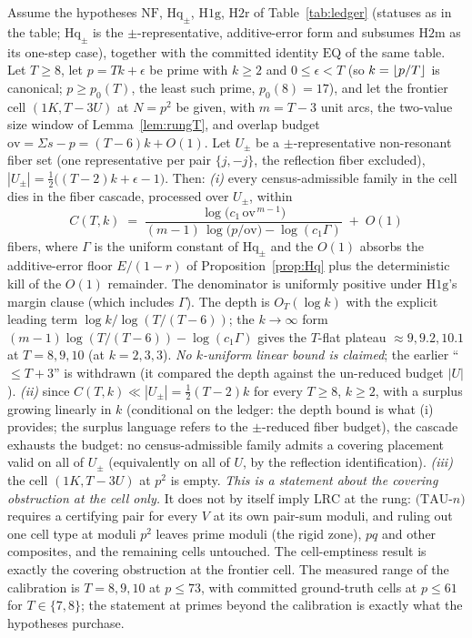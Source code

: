 \begin{theorem}\label{thm:SC}
Assume the hypotheses $\mathrm{NF}$, $\mathrm{Hq}_\pm$, $\mathrm{H1g}$,
$\mathrm{H2r}$ of Table~\ref{tab:ledger} (statuses as in the table;
$\mathrm{Hq}_\pm$ is the $\pm$-representative, additive-error form and
subsumes $\mathrm{H2m}$ as its one-step case), together with the
committed identity $\mathrm{EQ}$ of the same table. Let $T\ge 8$, let
$p=Tk+\epsilon$ be prime with $k\ge 2$ and $0\le\epsilon<T$ (so $k=\left\lfloor p/T \right\rfloor$
is canonical; $p\ge p_0(T)$, the least such prime, $p_0(8)=17$), and let the
frontier cell $(1K,T{-}3U)$ at $N=p^2$ be given, with $m=T-3$ unit arcs, the
two-value size window of Lemma~\ref{lem:rungT}, and overlap budget
$\mathrm{ov}=\Sigma s-p=(T-6)k+O(1)$. Let $U_\pm$ be a $\pm$-representative
non-resonant fiber set (one representative per pair $\{j,-j\}$, the
reflection fiber excluded), $|U_\pm|=\tfrac12\bigl((T-2)k+\epsilon-1\bigr)$.
Then:
\smallskip
\emph{(i)} every census-admissible family in the cell dies in the fiber
cascade, processed over $U_\pm$, within
\[
C(T,k)\;=\;
\frac{\log\!\bigl(c_1\,\mathrm{ov}^{\,m-1}\bigr)}
     {(m-1)\,\log\!\bigl(p/\mathrm{ov}\bigr)-\log(c_1\Gamma)}
\;+\;O(1)
\]
fibers, where $\Gamma$ is the uniform constant of $\mathrm{Hq}_\pm$ and the
$O(1)$ absorbs the additive-error floor $E/(1-r)$ of
Proposition~\ref{prop:Hq} plus the deterministic kill of the $O(1)$
remainder. The denominator is uniformly positive under $\mathrm{H1g}$'s
margin clause (which includes $\Gamma$). The depth is $O_T(\log k)$ with the
explicit leading term $\log k/\log(T/(T-6))$; the $k\to\infty$ form
$(m-1)\log(T/(T-6))-\log(c_1\Gamma)$ gives the $T$-flat plateau
$\approx 9,9.2,10.1$ at $T=8,9,10$ (at $k=2,3,3$). \emph{No $k$-uniform
linear bound is claimed}; the earlier ``$\le T+3$'' is withdrawn (it compared
the depth against the un-reduced budget $|U|$).
\smallskip
\emph{(ii)} since $C(T,k)\ll|U_\pm|=\tfrac12(T-2)k$ for every $T\ge8$,
$k\ge2$, with a surplus growing linearly in $k$ (conditional on the ledger:
the depth bound is what (i) provides; the surplus language refers to the
$\pm$-reduced fiber budget), the cascade exhausts the budget: no
census-admissible family admits a covering placement valid on all of
$U_\pm$ (equivalently on all of $U$, by the reflection identification).
\smallskip
\emph{(iii)} the cell $(1K,T{-}3U)$ at $p^2$ is empty. \emph{This is a
statement about the covering obstruction at the cell only.} It does not by
itself imply $\mathrm{LRC}$ at the rung: $(\mathrm{TAU}$-$n)$ requires a
certifying pair for every $V$ at its own pair-sum moduli, and ruling out one
cell type at moduli $p^2$ leaves prime moduli (the rigid zone), $pq$ and
other composites, and the remaining cells untouched. The cell-emptiness
result is exactly the covering obstruction at the frontier cell.
The measured range of the calibration is $T=8,9,10$ at $p\le 73$, with
committed ground-truth cells at $p\le 61$ for $T\in\{7,8\}$; the statement
at primes beyond the calibration is exactly what the hypotheses purchase.
\end{theorem}

